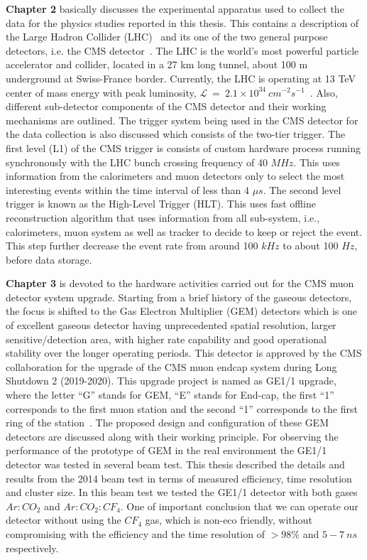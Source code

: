 \textbf{Chapter 2} basically discusses the experimental apparatus used to collect the data for the physics studies reported in this thesis. This contains a description of the Large Hadron Collider (LHC)~\cite{LHC-tdr-vol2,LHC-tdr-vol3,LHC-tdr-vol1} and its one of the two general purpose detectors, i.e. the CMS detector~\cite{paper:JINST:CMSCollaboration}. The LHC is the world's most powerful particle accelerator and collider, located in a 27 km long tunnel, about 100 m underground at Swiss-France border. Currently, the LHC is operating at 13 TeV center of mass energy with peak luminosity, $\mathcal{L}~=~2.1 \times 10^{34}~cm^{-2}s^{-1}$~\cite{cms-lumi-public-results,Muratori2006}. Also, different sub-detector components of the CMS detector and their working mechanisms are outlined. The trigger system being used in the CMS detector for the data collection is also discussed which consists of the two-tier trigger. The first level (L1) of the CMS trigger is consists of custom hardware process running synchronously with the LHC bunch crossing frequency of 40 $MHz$. This uses information from the calorimeters and muon detectors only to select the most interesting events within the time interval of less than 4 $\mu s$. The second level trigger is known as the High-Level Trigger (HLT). This uses fast offline reconstruction algorithm that uses information from all sub-system, i.e., calorimeters, muon system as well as tracker to decide to keep or reject the event. This step further decrease the event rate from around 100 $kHz$ to about 100 $Hz$, before data storage.

\textbf{Chapter 3} is devoted to the hardware activities carried out for the CMS muon detector system upgrade. Starting from a brief history of the gaseous detectors, the focus is shifted to the Gas Electron Multiplier (GEM) detectors which is one of excellent gaseous detector having unprecedented spatial resolution, larger sensitive/detection area, with higher rate capability and good operational stability over the longer operating periods. This detector is approved by the CMS collaboration for the upgrade of the CMS muon endcap system during Long Shutdown 2 (2019-2020). This upgrade project is named as GE1/1 upgrade, where the letter ``G'' stands for GEM, ``E'' stands for End-cap, the first ``1'' corresponds to the first muon station and the second ``1'' corresponds to the first ring of the station~\cite{Colaleo:2021453}. The proposed design and configuration of these GEM detectors are discussed along with their working principle. For observing the performance of the prototype of GEM in the real environment the GE1/1 detector was tested in several beam test. This thesis described the details and results from the 2014 beam test in terms of measured efficiency, time resolution and cluster size. In this beam test we tested the GE1/1 detector with both gases $Ar:CO_2$ and $Ar:CO_2:CF_4$. One of important conclusion that we can operate our detector without using the $CF_4$ gas, which is non-eco friendly, without compromising with the efficiency and the time resolution of $>98\%$ and $5-7~ns$ respectively.

